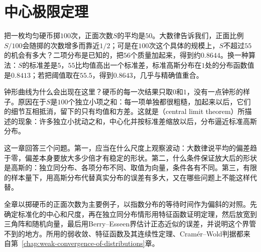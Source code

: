 \chapter{中心极限定理}
\label{chap:central-limit-theorem}

把一枚均匀硬币掷$100$次，正面次数$S$的平均是$50$。大数律告诉我们，正面比例$S/100$会随掷的次数增多而靠近$1/2$；可是在$100$次这个具体的规模上，$S$不超过$55$的机会有多大？二项分布是已知的，把$56$个质量加起来，得到约$0.8644$。换一种算法：$S$的标准差是$5$，$55$比均值高出一个标准差，标准高斯分布在$1$处的分布函数值是$0.8413$；若把阈值取在$55.5$，得到$0.8643$，几乎与精确值重合。

钟形曲线为什么会出现在这里？硬币的每一次结果只取$0$和$1$，没有一点钟形的样子。原因在于$S$是$100$个独立小项之和：每一项单独都很粗糙，加起来以后，它们的细节互相抵消，留下的只有均值和方差。这就是（central limit theorem）所描述的现象：许多独立小扰动之和，中心化并按标准差缩放以后，分布逼近标准高斯分布。

这一章回答三个问题。第一，应当在什么尺度上观察波动：大数律说平均的偏差趋于零，偏差本身要放大多少倍才有稳定的形状。第二，什么条件保证放大后的形状是高斯的：独立同分布、各项分布不同、取值为向量，条件各有不同。第三，有限的样本量下，用高斯分布代替真实分布的误差有多大，又在哪些问题上不能这样代替。

全章以掷硬币的正面次数为主要例子，以指数分布的等待时间作为偏斜的对照。先确定标准化的中心和尺度，再在独立同分布情形用特征函数证明定理，然后放宽到三角阵和随机向量，最后用Berry--Esseen界估计正态近似的误差，并说明这个界管不到的地方。所用的弱收敛、特征函数及其连续性定理、Cramér--Wold判据都来自第~\ref{chap:weak-convergence-of-distributions}章。













